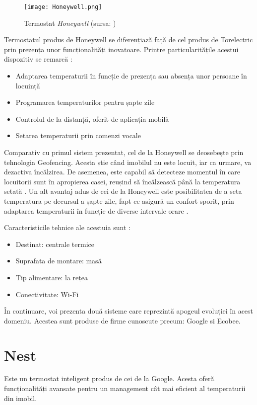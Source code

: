 \begin{wrapfigure}{l}{0.55\textwidth} 
	\centering
	\texttt{[image: Honeywell.png]}
	\caption{Termostat \textit{Honeywell} (sursa: \cite{honeywell})}
\end{wrapfigure}

	Termostatul produs de Honeywell se diferențiază față de cel produs de Torelectric prin prezența unor funcționalități inovatoare. Printre particularitățile acestui dispozitiv se remarcă \cite{honeywell}:
	\begin{itemize}
	\setlength{\itemindent}{2em}
		\itemsep0em
		\item Adaptarea temperaturii în funcție de prezența sau absența unor persoane în locuință 
		\item Programarea temperaturilor pentru șapte zile
		\item Controlul de la distanță, oferit de aplicația mobilă
		\item Setarea temperaturii prin comenzi vocale
	\end{itemize}

	Comparativ cu primul sistem prezentat, cel de la Honeywell se deosebește prin tehnologia Geofencing. Acesta știe când imobilul nu este locuit, iar ca urmare, va dezactiva încălzirea. De asemenea, este capabil să detecteze momentul în care locuitorii sunt în apropierea casei, reușind să încălzească până la temperatura setată \cite{honeywell}.
	Un alt avantaj adus de cei de la Honeywell este posibilitatea de a seta temperatura pe decursul a șapte zile, fapt ce asigură un confort sporit, prin adaptarea temperaturii în funcție de diverse intervale orare \cite{honeywell}.

	Caracteristicile tehnice ale acestuia sunt \cite{honeywell}:
	\begin{itemize}
	\setlength{\itemindent}{2em}
		\itemsep0em
		\item Destinat: centrale termice
		\item Suprafata de montare: masă
		\item Tip alimentare: la rețea
		\item Conectivitate: Wi-Fi
	\end{itemize}

	În continuare, voi prezenta două sisteme care reprezintă apogeul evoluției în acest domeniu. Acestea sunt produse de firme cunoscute precum: Google si Ecobee.

\section{Nest}
	Este un termostat inteligent produs de cei de la Google. Acesta oferă funcționalități avansate pentru un management cât mai eficient al temperaturii din imobil. 

